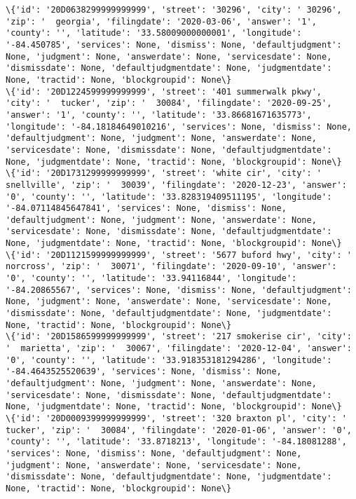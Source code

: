 \documentclass[11pt]{article}
\begin{document}
\begin{Verbatim}[commandchars=\\\{\}]
\{'id': '20D0638299999999999', 'street': '30296', 'city': ' 30296', 'zip': '  georgia', 'filingdate': '2020-03-06', 'answer': '1', 'county': '', 'latitude': '33.58009000000001', 'longitude': '-84.450785', 'services': None, 'dismiss': None, 'defaultjudgment': None, 'judgment': None, 'answerdate': None, 'servicesdate': None, 'dismissdate': None, 'defaultjudgmentdate': None, 'judgmentdate': None, 'tractid': None, 'blockgroupid': None\}
\{'id': '20D1224599999999999', 'street': '401 summerwalk pkwy', 'city': '  tucker', 'zip': '  30084', 'filingdate': '2020-09-25', 'answer': '1', 'county': '', 'latitude': '33.86681671635773', 'longitude': '-84.18184649010216', 'services': None, 'dismiss': None, 'defaultjudgment': None, 'judgment': None, 'answerdate': None, 'servicesdate': None, 'dismissdate': None, 'defaultjudgmentdate': None, 'judgmentdate': None, 'tractid': None, 'blockgroupid': None\}
\{'id': '20D1731299999999999', 'street': 'white cir', 'city': '  snellville', 'zip': '  30039', 'filingdate': '2020-12-23', 'answer': '0', 'county': '', 'latitude': '33.828319409511195', 'longitude': '-84.07114845647841', 'services': None, 'dismiss': None, 'defaultjudgment': None, 'judgment': None, 'answerdate': None, 'servicesdate': None, 'dismissdate': None, 'defaultjudgmentdate': None, 'judgmentdate': None, 'tractid': None, 'blockgroupid': None\}
\{'id': '20D1121599999999999', 'street': '5677 buford hwy', 'city': '  norcross', 'zip': '  30071', 'filingdate': '2020-09-10', 'answer': '0', 'county': '', 'latitude': '33.94116844', 'longitude': '-84.20865567', 'services': None, 'dismiss': None, 'defaultjudgment': None, 'judgment': None, 'answerdate': None, 'servicesdate': None, 'dismissdate': None, 'defaultjudgmentdate': None, 'judgmentdate': None, 'tractid': None, 'blockgroupid': None\}
\{'id': '20D1586599999999999', 'street': '217 smokerise cir', 'city': '  marietta', 'zip': '  30067', 'filingdate': '2020-12-04', 'answer': '0', 'county': '', 'latitude': '33.918353181294286', 'longitude': '-84.4643525520639', 'services': None, 'dismiss': None, 'defaultjudgment': None, 'judgment': None, 'answerdate': None, 'servicesdate': None, 'dismissdate': None, 'defaultjudgmentdate': None, 'judgmentdate': None, 'tractid': None, 'blockgroupid': None\}
\{'id': '20D0009399999999999', 'street': '320 braxton pl', 'city': '  tucker', 'zip': '  30084', 'filingdate': '2020-01-06', 'answer': '0', 'county': '', 'latitude': '33.8718213', 'longitude': '-84.18081288', 'services': None, 'dismiss': None, 'defaultjudgment': None, 'judgment': None, 'answerdate': None, 'servicesdate': None, 'dismissdate': None, 'defaultjudgmentdate': None, 'judgmentdate': None, 'tractid': None, 'blockgroupid': None\}

\end{Verbatim}
\end{document}
